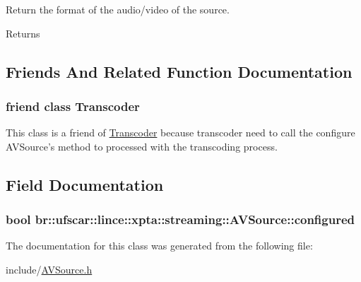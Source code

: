 Return the format of the audio/video of the source. 

\begin{DoxyReturn}{Returns}

\end{DoxyReturn}


\subsection{Friends And Related Function Documentation}
\hypertarget{classbr_1_1ufscar_1_1lince_1_1xpta_1_1streaming_1_1AVSource_af9f366fbe5cbc06f38791f120c62c182}{
\subsubsection[{Transcoder}]{\setlength{\rightskip}{0pt plus 5cm}friend class {\bf Transcoder}}}
\label{classbr_1_1ufscar_1_1lince_1_1xpta_1_1streaming_1_1AVSource_af9f366fbe5cbc06f38791f120c62c182}


This class is a friend of \hyperlink{classbr_1_1ufscar_1_1lince_1_1xpta_1_1streaming_1_1Transcoder}{Transcoder} because transcoder need to call the configure AVSource's method to processed with the transcoding process. 



\subsection{Field Documentation}
\hypertarget{classbr_1_1ufscar_1_1lince_1_1xpta_1_1streaming_1_1AVSource_a537e2164b07ff77a0a2a1c4c3154aa8f}{
\subsubsection[{configured}]{\setlength{\rightskip}{0pt plus 5cm}bool {\bf br::ufscar::lince::xpta::streaming::AVSource::configured}}}
\label{classbr_1_1ufscar_1_1lince_1_1xpta_1_1streaming_1_1AVSource_a537e2164b07ff77a0a2a1c4c3154aa8f}


The documentation for this class was generated from the following file:\begin{DoxyCompactItemize}
\item 
include/\hyperlink{AVSource_8h}{AVSource.h}\end{DoxyCompactItemize}
